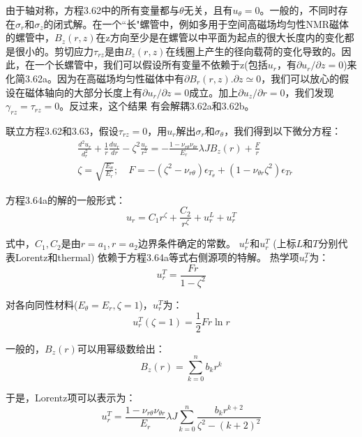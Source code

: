 由于轴对称，方程3.62中的所有变量都与$\theta$无关，且有$u_\theta=0$。一般的，不同时存在$\sigma_r$和$\sigma_z$的闭式解。在一个``长"螺管中，例如多用于空间高磁场均匀性NMR磁体的螺管中，$B_z(r, z)$在z方向至少是在螺管以中平面为起点的很大长度内的变化都是很小的。剪切应力$\tau_{rz}$是由$B_z(r,z)$在线圈上产生的径向载荷的变化导致的。因此，在一个长螺管中，我们可以假设所有变量不依赖于z(包括$u_r$，有$\partial u_r/\partial z=0$)来化简3.62a。因为在高磁场均匀性磁体中有$\partial B_r(r,z).\partial z\simeq 0$，我们可以放心的假设在磁体轴向的大部分长度上有$\partial u_r/\partial z=0$成立。加上$\partial u_z/\partial r=0$，我们发现$\gamma_{rz}=\tau_{rz}=0$。反过来，这个结果 有会解耦3.62a和3.62b。

联立方程3.62和3.63，假设$\tau_{rz}=0$，用$u_r$解出$\sigma_r$和$\sigma_{\theta}$，我们得到以下微分方程：
\begin{subequations}
	\begin{align}
&\frac{d^2u_r}{d_r^2}+\frac{1}{r}\frac{du_r}{dr}-\zeta^2\frac{u_r}{r^2}=-\frac{1-\nu_{r\theta}\nu_{\theta r}}{E_r}\lambda JB_z(r)+\frac{F}{r}\\
&\zeta=\sqrt{\frac{E_\theta}{E_r}};\quad F=
-(\zeta^2-\nu_{r \theta})\epsilon_{T_\theta}+(1-\nu_{\theta r}\zeta^2)\epsilon_{Tr}
	\end{align}
\end{subequations}

方程3.64a的解的一般形式：
\begin{equation}
u_r=C_1r^\zeta+\frac{C_2}{r^\zeta}+u_r^L+u_r^T
\end{equation}

式中，$C_1,C_2$是由$r = a_1, r = a_2$边界条件确定的常数。
$u^L_r$和$u^T_r$ (上标$L$和$T$分别代表Lorentz和thermal) 依赖于方程3.64a等式右侧源项的特解。
热学项$u^T_r$为：
\begin{equation}
u_r^T=\frac{Fr}{1-\zeta^2}
\end{equation}

对各向同性材料($E_\theta =E_r,\zeta =1$)，$u_r^T$为：
\begin{equation}
u_r^T(\zeta=1)=\frac{1}{2}Fr \ln r
\end{equation}

一般的，$B_z(r)$可以用幂级数给出：
\begin{equation}
B_z(r)=\sum_{k=0}^{n}b_kr^k
\end{equation}

于是，Lorentz项可以表示为：
\begin{equation}
u_r^T=\frac{1-\nu_{r\theta}\nu_{\theta r}}{E_r}\lambda J\sum_{k=0}^{n}\frac{b_k r^{k+2}}{\zeta^2-(k+2)^2}
\end{equation}

